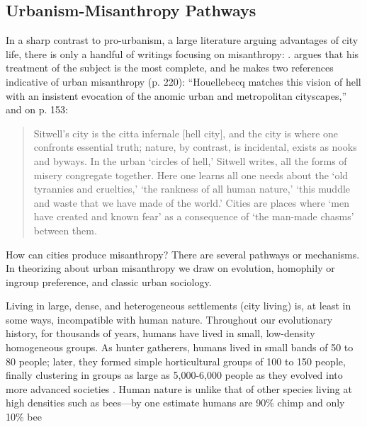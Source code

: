 \documentclass[11pt, letterpaper]{article}
\begin{document}
\begin{spacing}{1.4}
\subsection*{Urbanism-Misanthropy Pathways}

In a sharp contrast to pro-urbanism, a large literature arguing advantages
of city life, there is only a handful of writings focusing on misanthropy: 
\citet{thrift05,melgar13,keeling13,smith97,bloch87,wilson85,ray81,rosenberg57,rosenberg56}.
\citet{gibson17} argues that his treatment of the subject is %
 the most complete, and he makes two references indicative of urban
misanthropy (p. 220): ``Houellebecq matches this vision of hell with an
insistent evocation of the anomic urban and metropolitan cityscapes,'' and on p. 153:

\begin{quote}
  Sitwell's city is the citta infernale [hell city], and the city is where one confronts essential truth; nature, by contrast, is incidental, exists as nooks and byways. In the urban `circles of hell,' Sitwell writes, all the forms of misery congregate together.  Here one learns all one needs about the `old tyrannies and cruelties,' `the rankness of all human nature,' `this muddle and waste that we have made of the world.' Cities are places where `men have created and known fear' as a consequence of `the man-made chasms' between them.
\end{quote}


 How can cities produce misanthropy? There are several pathways or
mechanisms. In theorizing about urban misanthropy we draw on evolution,
homophily or ingroup preference, and classic
urban sociology.  

Living in large, dense, and heterogeneous settlements (city living) is, at least
in some ways, incompatible with human nature. Throughout our evolutionary
history, for thousands of years, humans have lived in small, low-density
homogeneous groups. As hunter gatherers, humans lived in small bands of 50 to 80
people; later, they formed simple horticultural groups of 100 to 150 people,
finally clustering in groups as large as 5,000-6,000  people as they evolved
into more advanced societies \citep{maryanski92}.
 Human nature is unlike that of other species living at high densities such as
 bees---by one estimate humans are 90\% chimp and only 10\% bee  \citep{haidt12B}


\end{spacing}
\end{document}
